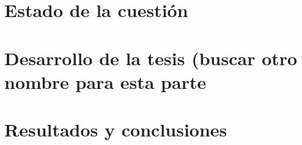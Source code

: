 \documentclass{upm-phd}
\begin{document}

\frontmatter
\maketitle





\cleardoublepage

\tableofcontents
\listoffigures
\listoftables

\mainmatter

\part{Estado de la cuestión}
\afterpage{\nopagecolor}



\part{Desarrollo de la tesis (buscar otro nombre para esta parte}
\afterpage{\nopagecolor}


\part{Resultados y conclusiones}
\afterpage{\nopagecolor}



\backmatter
\printglossaries



\printindex


\end{document}
